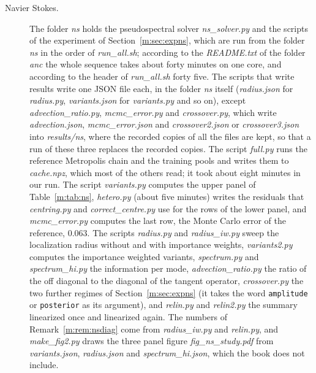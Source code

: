 \begin{description}
\item[Navier Stokes.] The folder \textit{ns} holds the pseudospectral solver \textit{ns\_solver.py} and the scripts of the experiment of Section~\ref{m:sec:expns}, which are run from the folder \textit{ns} in the order of \textit{run\_all.sh}; according to the \textit{README.txt} of the folder \textit{anc} the whole sequence takes about forty minutes on one core, and according to the header of \textit{run\_all.sh} forty five. The scripts that write results write one JSON file each, in the folder \textit{ns} itself (\textit{radius.json} for \textit{radius.py}, \textit{variants.json} for \textit{variants.py} and so on), except \textit{advection\_ratio.py}, \textit{mcmc\_error.py} and \textit{crossover.py}, which write \textit{advection.json}, \textit{mcmc\_error.json} and \textit{crossover2.json} or \textit{crossover3.json} into \textit{results/ns}, where the recorded copies of all the files are kept, so that a run of these three replaces the recorded copies. The script \textit{full.py} runs the reference Metropolis chain and the training pools and writes them to \textit{cache.npz}, which most of the others read; it took about eight minutes in our run. The script \textit{variants.py} computes the upper panel of Table~\ref{m:tab:ns}, \textit{hetero.py} (about five minutes) writes the residuals that \textit{centring.py} and \textit{correct\_centre.py} use for the rows of the lower panel, and \textit{mcmc\_error.py} computes the last row, the Monte Carlo error of the reference, $0.063$. The scripts \textit{radius.py} and \textit{radius\_iw.py} sweep the localization radius without and with importance weights, \textit{variants2.py} computes the importance weighted variants, \textit{spectrum.py} and \textit{spectrum\_hi.py} the information per mode, \textit{advection\_ratio.py} the ratio of the off diagonal to the diagonal of the tangent operator, \textit{crossover.py} the two further regimes of Section~\ref{m:sec:expns} (it takes the word \texttt{amplitude} or \texttt{posterior} as its argument), and \textit{relin.py} and \textit{relin2.py} the summary linearized once and linearized again. The numbers of Remark~\ref{m:rem:nsdiag} come from \textit{radius\_iw.py} and \textit{relin.py}, and \textit{make\_fig2.py} draws the three panel figure \textit{fig\_ns\_study.pdf} from \textit{variants.json}, \textit{radius.json} and \textit{spectrum\_hi.json}, which the book does not include.

\end{description}
